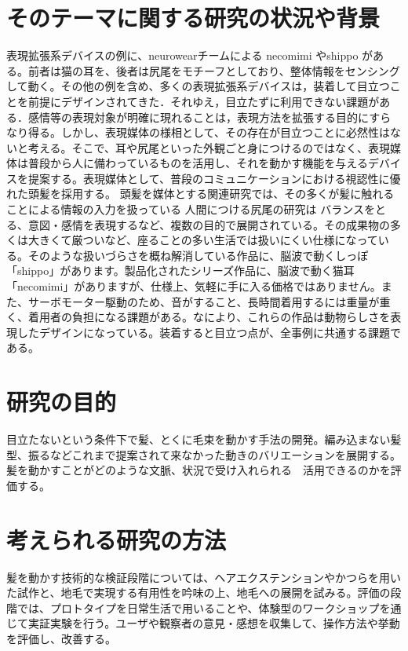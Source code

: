 \documentclass[a4paper]{jsarticle}
\begin{document}
\section{そのテーマに関する研究の状況や背景}
表現拡張系デバイスの例に、neurowearチームによる necomimi \cite{necomimi}やshippo \cite{shippo}がある。前者は猫の耳を、後者は尻尾をモチーフとしており、整体情報をセンシングして動く。その他の例を含め、多くの表現拡張系デバイスは，装着して目立つことを前提にデザインされてきた．それゆえ，目立たずに利用できない課題がある．感情等の表現対象が明確に現れることは，表現方法を拡張する目的にすらなり得る。しかし、表現媒体の様相として、その存在が目立つことに必然性はないと考える。そこで、耳や尻尾といった外観ごと身につけるのではなく、表現媒体は普段から人に備わっているものを活用し、それを動かす機能を与えるデバイスを提案する。表現媒体として、普段のコミュニケーションにおける視認性に優れた頭髪を採用する。
頭髪を媒体とする関連研究では、その多くが髪に触れることによる情報の入力を扱っている\cite{smartzWig}\cite{Hairware}
人間につける尻尾の研究は
バランスをとる\cite{Augmenting Human With a Tail}、意図・感情を表現する\cite{Augmenting Human With a Tail}など、複数の目的で展開されている。その成果物の多くは大きくて厳ついなど、座ることの多い生活では扱いにくい仕様になっている。そのような扱いづらさを概ね解消している作品に、脳波で動くしっぽ「shippo」\cite{necomimi}があります。製品化されたシリーズ作品に、脳波で動く猫耳「necomimi」\cite{necomimi}がありますが、仕様上、気軽に手に入る価格ではありません。また、サーボモーター駆動のため、音がすること、長時間着用するには重量が重く、着用者の負担になる課題がある。なにより、これらの作品は動物らしさを表現したデザインになっている。装着すると目立つ点が、全事例に共通する課題である。%

\section{研究の目的} 
目立たないという条件下で髪、とくに毛束を動かす手法の開発。編み込まない髪型、振るなどこれまで提案されて来なかった動きのバリエーションを展開する。髪を動かすことがどのような文脈、状況で受け入れられる　活用できるのかを評価する。

\section{考えられる研究の方法} 
髪を動かす技術的な検証段階については、ヘアエクステンションやかつらを用いた試作と、地毛で実現する有用性を吟味の上、地毛への展開を試みる。評価の段階では、プロトタイプを日常生活で用いることや、体験型のワークショップを通じて実証実験を行う。ユーザや観察者の意見・感想を収集して、操作方法や挙動を評価し、改善する。
\end{document}
